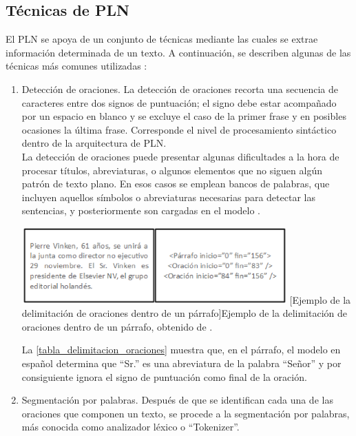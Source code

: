 \subsection{Técnicas de PLN}
El PLN se apoya de un conjunto de técnicas mediante las cuales se extrae información determinada de un texto. A continuación, se describen algunas de las técnicas más comunes utilizadas \cite{ref47}:

\begin{enumerate}
    \item Detección de oraciones. La detección de oraciones recorta una secuencia de caracteres entre dos signos de puntuación; el signo debe estar acompañado por un espacio en blanco y se excluye el caso de la primer frase y en posibles ocasiones la última frase. Corresponde el nivel de procesamiento sintáctico dentro de la arquitectura de PLN.\\
    
La detección de oraciones puede presentar algunas dificultades a la hora de procesar títulos, abreviaturas, o algunos elementos que no siguen algún patrón de texto plano. En esos casos se emplean bancos de palabras, que incluyen aquellos símbolos o abreviaturas necesarias para detectar las sentencias, y posteriormente son cargadas en el modelo \cite{ref47}.
\begin{center}
    \includegraphics[width=0.8\textwidth]{Images/Cap 2/Deteccion_Oraciones.png}
    [Ejemplo de la delimitación de oraciones dentro de un párrafo]{Ejemplo de la delimitación de oraciones dentro de un párrafo, obtenido de \cite{ref47}.}
    \label{tabla_delimitacion_oraciones}
\end{center}
La \autoref{tabla_delimitacion_oraciones} muestra que, en el párrafo, el modelo en español determina que “Sr.” es una abreviatura de la palabra “Señor” y por consiguiente ignora el signo de puntuación como final de la oración.

\item Segmentación por palabras. Después de que se identifican cada una de las oraciones que componen un texto, se procede a la segmentación por palabras, más conocida como analizador léxico o “Tokenizer”.\\


\end{enumerate}

